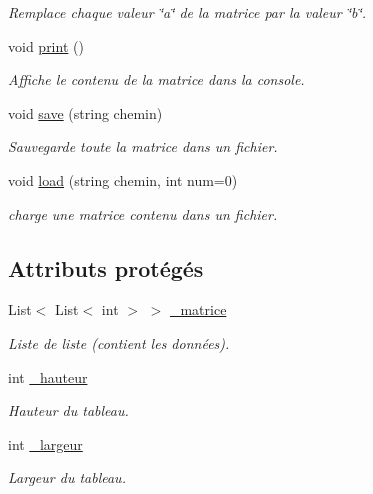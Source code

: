 \begin{DoxyCompactItemize}
\begin{DoxyCompactList}\small\item\em Remplace chaque valeur \char`\"{}a\char`\"{} de la matrice par la valeur \char`\"{}b\char`\"{}. \end{DoxyCompactList}\item 
void \hyperlink{class_matrice_ad56071409baa0132735123049f27554f}{print} ()
\begin{DoxyCompactList}\small\item\em Affiche le contenu de la matrice dans la console. \end{DoxyCompactList}\item 
void \hyperlink{class_matrice_a1cf5f2836440913f2d4743ac19743ff3}{save} (string chemin)
\begin{DoxyCompactList}\small\item\em Sauvegarde toute la matrice dans un fichier. \end{DoxyCompactList}\item 
void \hyperlink{class_matrice_aee7c3766d6b49ea2cd8b7dd0eb2cfa81}{load} (string chemin, int num=0)
\begin{DoxyCompactList}\small\item\em charge une matrice contenu dans un fichier. \end{DoxyCompactList}\end{DoxyCompactItemize}
\subsection*{Attributs protégés}
\begin{DoxyCompactItemize}
\item 
List$<$ List$<$ int $>$ $>$ \hyperlink{class_matrice_af98e31a75e7e943e7fa7e59acd779a8b}{\+\_\+matrice}
\begin{DoxyCompactList}\small\item\em Liste de liste (contient les données).\end{DoxyCompactList}\item 
int \hyperlink{class_matrice_afd223a80742ca7c9c7ba6fb719289388}{\+\_\+hauteur}
\begin{DoxyCompactList}\small\item\em Hauteur du tableau.\end{DoxyCompactList}\item 
int \hyperlink{class_matrice_a6db7d42ff5538e68e3b58eec9dc44285}{\+\_\+largeur}
\begin{DoxyCompactList}\small\item\em Largeur du tableau.\end{DoxyCompactList}\end{DoxyCompactItemize}
